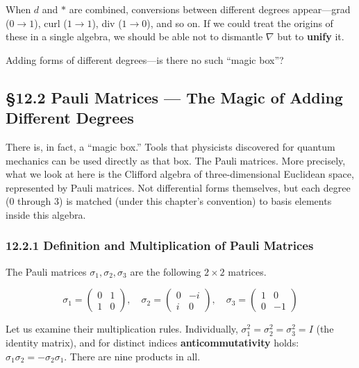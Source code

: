 \documentclass[a4paper,12pt,openany]{book}
\begin{document}
When \(d\) and \(\ast\) are combined, conversions between different
degrees appear—grad (\(0\to1\)), curl (\(1\to1\)), div (\(1\to0\)),
and so on. If we could treat the origins of these in a single algebra,
we should be able not to dismantle \(\nabla\) but to \textbf{unify} it.

Adding forms of different degrees—is there no such ``magic box''?

\par\vspace{0.35em}\par

\hypertarget{pauli-matrices-the-magic-of-adding-different-degrees}{%
\subsection{§12.2 Pauli Matrices — The Magic of Adding Different
Degrees}\label{pauli-matrices-the-magic-of-adding-different-degrees}}

There is, in fact, a ``magic box.'' Tools that physicists discovered for
quantum mechanics can be used directly as that box. The Pauli matrices.
More precisely, what we look at here is the Clifford algebra of
three-dimensional Euclidean space, represented by Pauli matrices. Not
differential forms themselves, but each degree (\(0\) through \(3\)) is
matched (under this chapter's convention) to basis elements inside this
algebra.

\hypertarget{definition-and-multiplication-of-pauli-matrices}{%
\subsubsection{12.2.1 Definition and Multiplication of Pauli
Matrices}\label{definition-and-multiplication-of-pauli-matrices}}

The Pauli matrices \(\sigma_1, \sigma_2, \sigma_3\) are the following
\(2\times2\) matrices.

\[
\sigma_1 = \begin{pmatrix}0 & 1 \\ 1 & 0\end{pmatrix},\quad
\sigma_2 = \begin{pmatrix}0 & -i \\ i & 0\end{pmatrix},\quad
\sigma_3 = \begin{pmatrix}1 & 0 \\ 0 & -1\end{pmatrix}
\]

Let us examine their multiplication rules. Individually,
\(\sigma_1^2 = \sigma_2^2 = \sigma_3^2 = I\) (the identity matrix), and
for distinct indices \textbf{anticommutativity} holds:
\(\sigma_1\sigma_2 = -\sigma_2\sigma_1\). There are nine products in
all.
\end{document}
